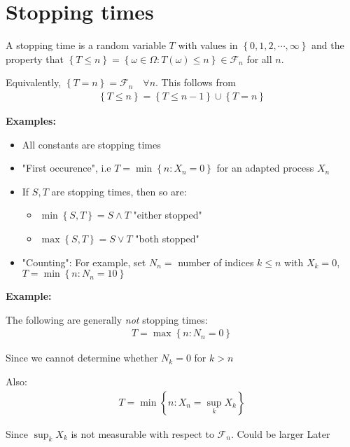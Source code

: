 \section{Stopping times}
A stopping time is a random variable $T$ with values in $\left\{0,1,2,\cdots,\infty\right\}$ and the property that $\left\{T\leq n\right\} = \left\{\omega\in\Omega:T(\omega)\leq n\right\}\in\mathcal{F}_n$ for all $n$.\par
\noindent Equivalently, $\left\{T=n\right\} = \mathcal{F}_n \quad\forall n$. This follows from
\begin{equation*}
  \begin{gathered}
  \left\{T\leq n\right\} = \left\{T\leq n-1\right\}\cup \left\{T=n\right\}
  \end{gathered}
\end{equation*}
\par\bigskip
\noindent\textbf{Examples:}
\begin{itemize}
  \item All constants are stopping times
  \item "First occurence", i.e $T = \min\left\{n:X_n=0\right\}$ for an adapted process $X_n$
  \item  If $S,T$ are stopping times, then so are:
    \begin{itemize}
      \item $\min\left\{S,T\right\} = S\wedge T$ "either stopped"
      \item $\max\left\{S,T\right\} = S\vee T$ "both stopped"
    \end{itemize}
  \item "Counting": For example, set $N_n = $  number of indices $k\leq n$ with $X_k=0$, $T=\min\left\{n:N_n=10\right\}$
\end{itemize}
\par\bigskip
\noindent\textbf{Example:}\par
\noindent The following are generally \textit{not} stopping times:
\begin{equation*}
  \begin{gathered}
  T = \max\left\{n:N_n=0\right\} 
  \end{gathered}
\end{equation*}\par
\noindent Since we cannot determine whether $N_k = 0$ for $k>n$
\par\bigskip
\noindent Also:
\begin{equation*}
  \begin{gathered}
  T = \min\left\{n:X_n = \sup_k X_k\right\}
  \end{gathered}
\end{equation*}\par
\noindent Since $\sup_k X_k$ is not measurable with respect to $\mathcal{F}_n$. Could be larger Later
\par\bigskip
